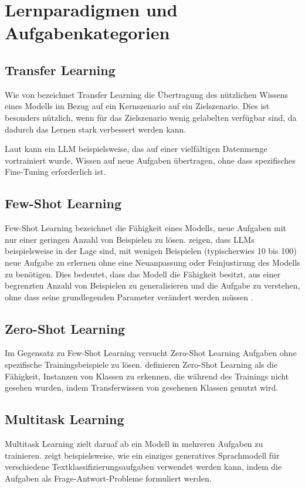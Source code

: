 \section{Lernparadigmen und Aufgabenkategorien}
\label{sec:lernparadigmen-aufgabenkategorien}

\subsection{Transfer Learning}
\label{subsec:transfer-learning}
Wie von \textcite{PanSinnoJialin2010ASoT} bezeichnet Transfer Learning die Übertragung des nützlichen Wissens eines Modells im Bezug auf ein Kernszenario auf ein Zielszenario. Dies ist besonders nützlich, wenn für das Zielszenario wenig gelabelten verfügbar sind, da dadurch das Lernen stark verbessert werden kann.

Laut \textcite{BrownTomB2020LMaF} kann ein \gls{LLM} beispielsweise, das auf einer vielfältigen Datenmenge vortrainiert wurde, Wissen auf neue Aufgaben übertragen, ohne dass spezifisches Fine-Tuning erforderlich ist.

\subsection{Few-Shot Learning}
\label{subsec:few-shot-learning}
Few-Shot Learning bezeichnet die Fähigkeit eines Modells, neue Aufgaben mit nur einer geringen Anzahl von Beispielen zu lösen. \textcite{BrownTomB2020LMaF} zeigen, dass \glspl{LLM} beispielsweise in der Lage sind, mit wenigen Beispielen (typischerwies 10 bis 100) neue Aufgabe zu erlernen ohne eine Neuanpassung oder Feinjustirung des Modells zu benötigen. Dies bedeutet, dass das Modell die Fähigkeit besitzt, aus einer begrenzten Anzahl von Beispielen zu generalisieren und die Aufgabe zu verstehen, ohne dass seine grundlegenden Parameter verändert werden müssen \cite{BrownTomB2020LMaF}.

\subsection{Zero-Shot Learning}
\label{subsec:zero-shot-learning}
Im Gegensatz zu Few-Shot Learning versucht Zero-Shot Learning Aufgaben ohne spezifische Trainingsbeispiele zu lösen. \textcite{XianYongqin2019ZLCE} definieren Zero-Shot Learning als die Fähigkeit, Instanzen von Klassen zu erkennen, die während des Trainings nicht gesehen wurden, indem Transferwissen von gesehenen Klassen genutzt wird.

\subsection{Multitask Learning}
\label{subsec:multitask-learning}
Multitask Learning zielt daruaf ab ein Modell in mehreren Aufgaben zu trainieren. \textcite{PuriRaul2019ZTCW} zeigt beispielsweise, wie ein einziges generatives Sprachmodell für verschiedene Textklassifizierungsaufgaben verwendet werden kann, indem die Aufgaben als Frage-Antwort-Probleme formuliert werden.